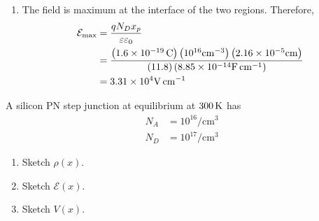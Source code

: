 \documentclass[titlepage, fleqn, a4paper, 12pt, twoside]{article}
\theoremstyle{definition}
\theoremstyle{theorem}
\begin{document}
\begin{solution}
\begin{enumerate}[leftmargin=*]
\begin{figure}[H]
			\end{figure}
		\item
			The field is maximum at the interface of the two regions.
			Therefore,
			\begin{align*}
				\mathcal{E}_{\text{max}} &= \frac{q N_D x_p}{\varepsilon \varepsilon_0}\\
				&= \frac{\left( 1.6 \times 10^{-19} \coulomb \right) \left( 10^{16} \si{\per\centi\metre\cubed} \right) \left( 2.16 \times 10^{-5} \si{\centi\metre} \right)}{(11.8) \left( 8.85 \times 10^{-14} \si{\farad\per\centi\metre} \right)}\\
				&= 3.31 \times 10^4 \si{\volt\per\centi\metre}
			\end{align*}
	\end{enumerate}
\end{solution}

\begin{question}
	A silicon PN step junction at equilibrium at $300 \kelvin$ has
	\begin{align*}
		N_A &= 10^{16} \si{\per\centi\metre\cubed}\\
		N_D &= 10^{17} \si{\per\centi\metre\cubed}
	\end{align*}
	\begin{enumerate}
		\item Sketch $\rho(x)$.
		\item Sketch $\mathcal{E}(x)$.
		\item Sketch $V(x)$.
	\end{enumerate}
\end{question}
\end{document}
